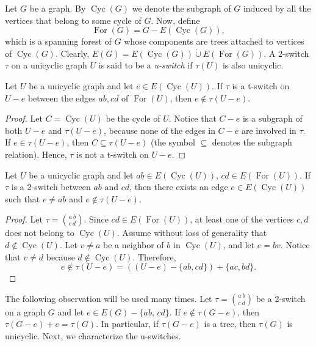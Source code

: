 \documentclass{BICA}
\newcommand{\Forest}{\operatorname{For}}
\newcommand{\Cycles}{\operatorname{Cyc}}
\begin{document}
Let $G$ be a graph. By \(\Cycles(G)\) we denote the subgraph of $G$ induced by all the vertices that belong to some cycle of \(G\). Now, define
\[ \Forest(G) = G - E(\Cycles(G)), \]
which is a spanning forest of $G$ whose components are trees attached to vertices of \(\Cycles(G)\). Clearly, $E(G)=E(\Cycles(G))\dot{\cup} E(\Forest(G))$. A 2-switch $\tau$ on a unicyclic graph $U$ is said to be a \emph{u-switch} if $\tau(U)$ is also unicyclic.

\begin{lemma}
    \label{lem.tswitch.U-e}
    Let $U$ be a unicyclic graph and let $e\in E(\Cycles(U))$. If $\tau$ is a t-switch on $U-e$ between the edges $ab,cd$ of $\Forest(U)$, then $e\notin\tau(U-e)$.
\end{lemma}
\begin{proof}
	Let $C=\Cycles(U)$ be the cycle of $U$.	Notice that $C-e$ is a subgraph of both $U-e$ and $\tau(U-e)$, because none of the edges in $C-e$ are involved in $\tau$. If $e\in \tau(U-e)$, then $C\subseteq\tau(U-e)$ (the symbol $\subseteq$ denotes the subgraph relation). Hence, $\tau$ is not a t-switch on $U-e$.
\end{proof}

\begin{lemma}
    \label{lem2.tswitch.U-e}
    Let $U$ be a unicyclic graph and let $ab\in E(\Cycles(U))$, $cd\in E(\Forest(U))$. If $\tau$ is a 2-switch between $ab$ and $cd$, then there exists an edge $e\in E(\Cycles(U))$ such that $e\neq ab$ and $e\notin\tau(U-e)$.
\end{lemma}

\begin{proof}
	Let $\tau={{a \ b}\choose{c \ d}}$.
	Since $cd\in E(\Forest(U))$, at least one of the vertices $c, d$ does not belong to $\Cycles(U)$. Assume without loss of generality that $d\not\in \Cycles(U)$. Let $v\neq a$ be a neighbor of $b$ in $\Cycles(U)$, and let $e=bv$. Notice that $v\neq d$ because $d\not\in \Cycles(U)$. Therefore,
	\[e\not\in \tau(U-e)=((U-e)-\{ab,cd\})+\{ac,bd\}.\]\qedhere
\end{proof}

The following observation will be used many times. Let $\tau= {{a \ b}\choose{c \ d}}$ be a 2-switch on a graph $G$ and let $e\in E(G)-\{ab,\,cd\}$. If $e\notin\tau(G-e)$, then $\tau(G-e)+e=\tau(G)$. In particular, if $\tau(G-e)$ is a tree, then $\tau(G)$ is unicyclic. Next, we characterize the u-switches.
\end{document}
